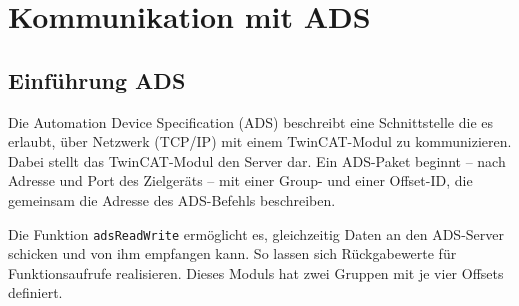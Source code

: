 \documentclass{fh-ium-bama}
\begin{document}
\newpage
\chapter{Kommunikation mit ADS}
\section{Einführung ADS}
Die Automation Device Specification (ADS) beschreibt eine Schnittstelle die es erlaubt, über Netzwerk (TCP/IP) mit einem TwinCAT-Modul zu kommunizieren. Dabei stellt das TwinCAT-Modul den Server dar. Ein ADS-Paket beginnt – nach Adresse und Port des Zielgeräts – mit einer Group- und einer Offset-ID, die gemeinsam die Adresse des ADS-Befehls beschreiben.

Die Funktion \lstinline|adsReadWrite| ermöglicht es, gleichzeitig Daten an den ADS-Server schicken und von ihm empfangen kann. So lassen sich Rückgabewerte für Funktionsaufrufe realisieren. Dieses Moduls hat zwei Gruppen mit je vier Offsets definiert.
\end{document}
